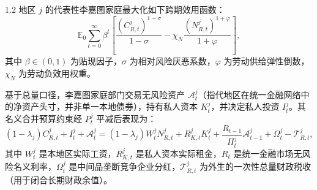 \documentclass[12pt,UTF8]{ctexart}
\newcommand{\E}{\mathbb{E}}
\begin{document}
\begin{spacing}{1.2}
		地区 $j$ 的代表性李嘉图家庭最大化如下跨期效用函数：
		\begin{equation}
			\E_0\sum_{t=0}^{\infty}\beta^t
			\left[
			\frac{(C_{R,t}^j)^{1-\sigma}}{1-\sigma}
			-\chi_N\frac{(N_{R,t}^j)^{1+\varphi}}{1+\varphi}
			\right],
		\end{equation}
		其中 $\beta \in (0,1)$ 为贴现因子，$\sigma$ 为相对风险厌恶系数，$\varphi$ 为劳动供给弹性倒数，$\chi_N$ 为劳动负效用权重。
		
		基于总量口径，李嘉图家庭部门交易无风险资产 $\mathcal A_t^j$（指代地区在统一金融网络中的净资产头寸，并非单一本地债券），持有私人资本 $K_t^j$，并决定私人投资 $I_t^j$。其名义合并预算约束经 $P_t^j$ 平减后表现为：
		\begin{equation}
			(1-\lambda_j)C_{R,t}^j+I_t^j+\mathcal A_t^j
			=
			(1-\lambda_j)W_t^jN_{R,t}^j+R_{K,t}^jK_t^j
			+\frac{R_{t-1}}{\Pi_t^j}\mathcal A_{t-1}^j
			+\Omega_t^j-\mathcal T_{R,t}^j,
			\label{eq:budget_R}
		\end{equation}
		其中 $W_t^j$ 是本地区实际工资，$R_{K,t}^j$ 是私人资本实际租金，$R_t$ 是统一金融市场无风险名义利率，$\Omega_t^j$ 是中间品垄断竞争企业分红，$\mathcal T_{R,t}^j$ 为外生的一次性总量财政税收（用于闭合长期财政余值）。
		

\end{spacing}
\end{document}
